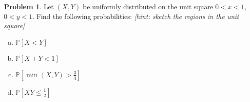 \documentclass[10pt]{article}
\theoremstyle{definition}
\newtheorem{problem}[theorem]{Problem}
\newcommand{\1}[1]{\textbf{1}_{\left[#1\right]}} %
\def\P{\mathbb{P}} %
\begin{document}

\begin{problem}
  Let $(X,Y)$ be uniformly distributed on the unit square $0<x<1$, $0<y<1$.
  Find the following probabilities: \textit{[hint: sketch the regions in the unit
  square]}
  \begin{enumerate}[(a)]
    \item $\P\left[X<Y \right]$
    \item $\P\left[X+Y<1 \right]$
    \item $\P\left[\min(X,Y) >\frac{3}{4} \right]$
    \item $\P\left[XY \leq \frac{1}{2}\right]$
  \end{enumerate}
\end{problem}
\end{document}
